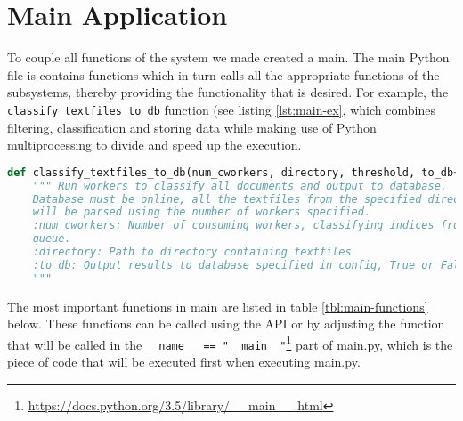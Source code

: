 \section{Main Application} \label{sec:main-app}
To couple all functions of the system we made created a main. The main Python file is contains functions which in turn calls all the appropriate functions of the subsystems, thereby providing the functionality that is desired. For example, the \texttt{classify\_textfiles\_to\_db} function (see listing \ref{lst:main-ex}, which combines filtering, classification and storing data while making use of Python multiprocessing to divide and speed up the execution.

\begin{lstlisting}[language=Python, caption=Header of a function in main.py, label={lst:main-ex}]
def classify_textfiles_to_db(num_cworkers, directory, threshold, to_db=False):
    """ Run workers to classify all documents and output to database.
    Database must be online, all the textfiles from the specified directory
    will be parsed using the number of workers specified.
    :num_cworkers: Number of consuming workers, classifying indices from the
    queue.
    :directory: Path to directory containing textfiles
    :to_db: Output results to database specified in config, True or False
    """
\end{lstlisting}

The most important functions in main are listed in table \ref{tbl:main-functions} below. These functions can be called using the API or by adjusting the function that will be called in the \texttt{\_\_name\_\_ == "\_\_main\_\_"}\footnote{\url{https://docs.python.org/3.5/library/__main__.html}} part of main.py, which is the piece of code that will be executed first when executing main.py.


